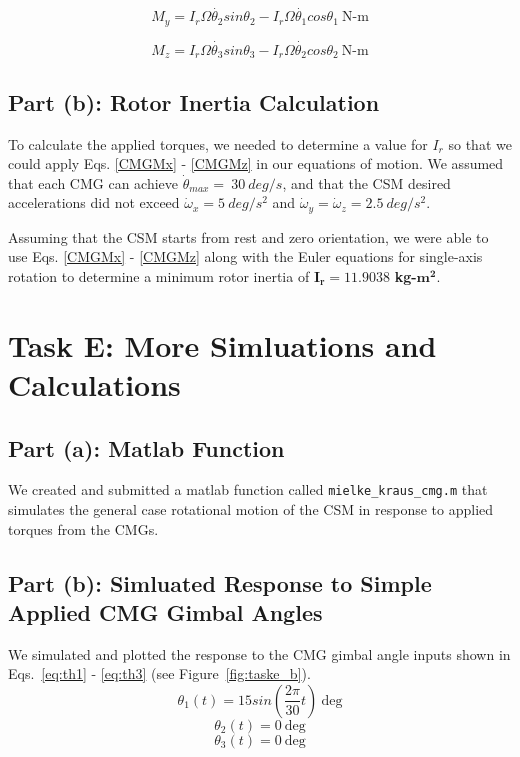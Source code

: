 \documentclass{article}
\begin{document}
\begin{equation}\label{CMGMy}
    M_y = I_r\Omega \dot{\theta_2} sin{\theta_2} - I_r\Omega \dot{\theta_1} cos{\theta_1} \:\text{N-m}
\end{equation}

\begin{equation}\label{CMGMz}
    M_z = I_r\Omega \dot{\theta_3} sin{\theta_3} - I_r\Omega \dot{\theta_2} cos{\theta_2} \:\text{N-m}
\end{equation}

\subsection{Part (b): Rotor Inertia Calculation}
To calculate the applied torques, we needed to determine a value for $I_r$ so that we could apply Eqs. \ref{CMGMx} - \ref{CMGMz} in our equations of motion. We assumed that each CMG can achieve $\dot{\theta}_{max} = \ 30 \ deg/s$, and that the CSM desired accelerations did not exceed $\dot{\omega}_x = 5 \ deg/s^2$ and $\dot{\omega}_y = \dot{\omega}_z = 2.5 \ deg/s^2$. 

Assuming that the CSM starts from rest and zero orientation, we were able to use Eqs. \ref{CMGMx} - \ref{CMGMz} along with the Euler equations for single-axis rotation to determine a minimum rotor inertia of $\mathbf{I_r = 11.9038}$ \:\textbf{kg-}$\mathbf{m^2}$.

\section{Task E: More Simluations and Calculations}
\subsection{Part (a): Matlab Function}
We created and submitted a matlab function called \verb|mielke_kraus_cmg.m| that simulates the general case rotational motion of the CSM in response to applied torques from the CMGs.


\subsection{Part (b): Simluated Response to Simple Applied CMG Gimbal Angles}
We simulated and plotted the response to the CMG gimbal angle inputs shown in Eqs.~\ref{eq:th1} - \ref{eq:th3} (see Figure~\ref{fig:taske_b}).
\begin{equation}\label{eq:th1}
    \theta_1(t) = 15 sin(\dfrac{2 \pi}{30} t) \:\text{deg}
\end{equation}
\begin{equation}\label{eq:th2}
    \theta_2(t) = 0 \:\text{deg}
\end{equation}
\begin{equation}\label{eq:th3}
    \theta_3(t) = 0 \:\text{deg}
\end{equation}
\end{document}
